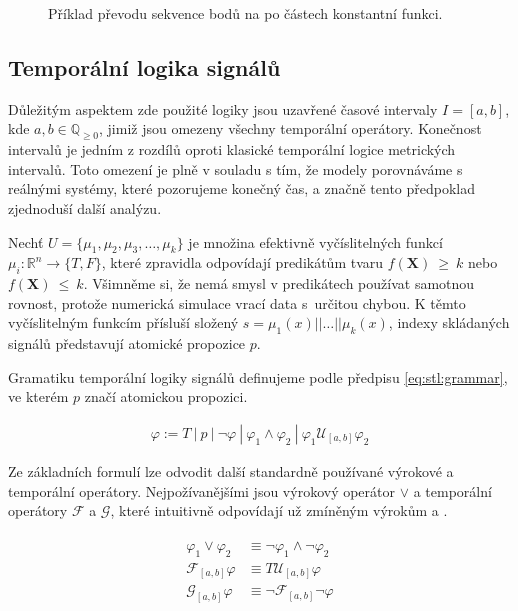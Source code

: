 \begin{figure}[h!]
\begin{center}
\end{center}
\caption{Příklad převodu sekvence bodů na po částech konstantní funkci.}
\end{figure}

\subsection{Temporální logika signálů}
Důležitým aspektem zde použité logiky jsou uzavřené časové intervaly $I = [a, b]$, kde $a, b \in \mathbb{Q}_{\geq0}$,
jimiž jsou omezeny všechny temporální operátory. Konečnost intervalů je jedním z rozdílů
oproti klasické temporální logice metrických intervalů. Toto omezení je plně v souladu s tím,
že modely porovnáváme s reálnými systémy, které pozorujeme konečný čas, a značně tento předpoklad
zjedno\-du\-ší další analýzu.

Nechť $U = \{\mu_1, \mu_2, \mu_3, \ldots, \mu_k\}$ je množina efektivně vyčíslitelných funkcí
$\mu_i: \mathbb{R}^n \rightarrow \{T, F\}$, které zpravidla odpovídají predikátům tvaru
$f(\mathbf{X})~\geq~k$ nebo $f(\mathbf{X})~\leq~k$. Všimněme si, že nemá smysl v predikátech
používat samotnou rovnost, protože numerická simulace vrací data s~určitou chybou.
K těmto vyčíslitelným funkcím přísluší složený $s = \mu_1(x)|| \ldots|| \mu_k(x)$,
indexy skládaných signálů představují atomické propozice $p$.

Gramatiku temporální logiky signálů definujeme podle předpisu \ref{eq:stl:grammar},
ve kterém $p$ značí atomickou propozici.

\begin{align}\label{eq:stl:grammar}
\varphi := T~|~p~|~\neg\varphi~|~\varphi_1 \wedge \varphi_2~|~\varphi_1\mathcal{U}_{[a,b]}\varphi_2
\end{align}

Ze základních formulí lze odvodit další standardně používané výrokové a temporální operátory.
Nejpožívanějšími jsou výrokový operátor $\vee$ a temporální operátory $\mathcal{F}$ a $\mathcal{G}$,
které intuitivně odpovídají už zmíněným výrokům  a .

\begin{align}\label{eq:stl:other}
\begin{array}{ll}
\varphi_1\vee\varphi_2 		&\equiv \neg\varphi_1 \wedge \neg\varphi_2		\\
\mathcal{F}_{[a,b]}\varphi 	&\equiv T\mathcal{U}_{[a,b]}\varphi				\\
\mathcal{G}_{[a,b]}\varphi 	&\equiv \neg\mathcal{F}_{[a,b]}\neg\varphi		\\
\end{array}
\end{align}

